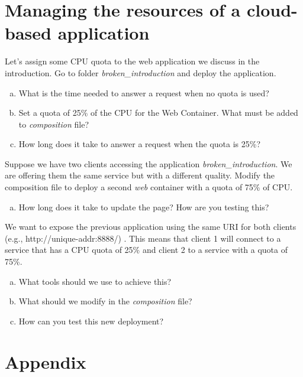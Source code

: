 \documentclass[a4paper,11pt]{exam}
\begin{document}
\section{Managing the resources of a cloud-based application}
\begin{questions}
	\question Let's assign some CPU quota to the web application we discuss in the introduction. Go to folder \textit{broken\_introduction} and deploy the application.
	
	\begin{enumerate}[(a)] %
		\item What is the time needed to answer a request when no quota is used?
		\item Set a quota of 25\% of the CPU for the Web Container. What must be added to \textit{composition} file? 
		\item How long does it take to answer a request when the quota is 25\%?
	\end{enumerate}
	
	\question Suppose we have two clients accessing the application \textit{broken\_introduction}. We are offering them the same service but with a different quality. Modify the composition file to deploy a second \textit{web} container with a quota of 75\% of CPU.
	
	\begin{enumerate}[(a)] %
	 	\item How long does it take to update the page? How are you testing this?
	\end{enumerate}
	
	\question We want to expose the previous application using the same URI for both clients (e.g., http://unique-addr:8888/) . This means that client 1 will connect to a service that has a CPU quota of 25\% and client 2 to a service with a quota of 75\%.
	 
	\begin{enumerate}[(a)] %
		\item What tools should we use to achieve this?
		\item What should we modify in the \textit{composition} file?
		\item How can you test this new deployment?
	\end{enumerate}
	
\end{questions}
\section{Appendix}
\end{document}
